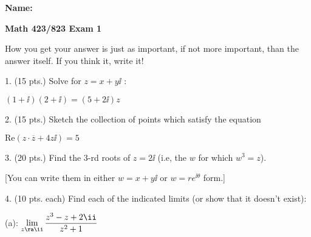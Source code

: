     


\loadmsbm

\def\ssk{\smallskip}
\def\ctln{\centerline}
\def\msk{\medskip}
\def\bsk{\bigskip}
\def\dl{\displaystyle}
\def\vdd{\vfill\eject}
\def\vfe{\vfill\eject}
\def\vdr{\bigskip}
\ra{\rightarrow}




\overfullrule=0pt

{\bf Name:}

\medskip

\centerline{\bf Math 423/823 Exam 1}

\smallskip

 How you get your answer is just 
as important, if not more important, than the 
answer itself. If you think it, write it!

\bigskip

\item{1.} (15 pts.) Solve for $z=x+y\ii$ :

\msk

\ctln{$(1+\ii)(2+\ii)=(5+2\ii)z$}

\vdd

\item{2.} (15 pts.) Sketch the collection of points which satisfy the equation

\msk

\ctln{$\text{Re}(z\cdot\overline{z}+4z\ii)=5$}

\vskip1in

\leavevmode

\epsfxsize=2.8in
\hfill{}

\vdd

\item{3.} (20 pts.) Find the 3-rd roots of $z=2\ii$ (i.e, the $w$ for which $w^3=z$).

\msk

\item{} [You can write them in either $w=x+y\ii$ or $w=re^{\ii\theta}$ form.]

\vdd

\item{4.} (10 pts. each) Find each of the indicated limits (or show that it doesn't exist):

\msk

\item{} (a): $\dl\lim_{z\ra\ii}{{z^3-z+2\ii}\over{z^2+1}}$

